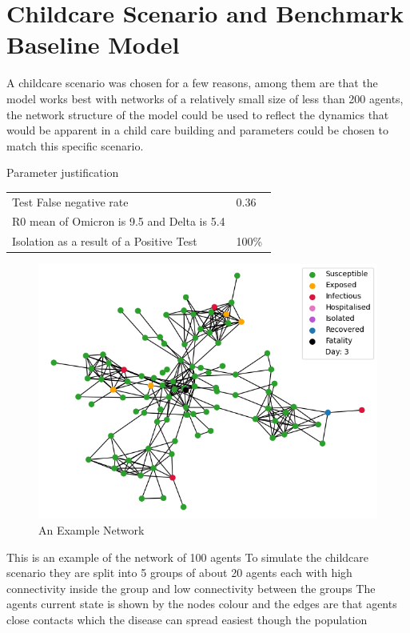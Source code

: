 \documentclass{article}
\begin{document}
\newpage



\newpage
\section{Childcare Scenario and Benchmark Baseline Model}


A childcare scenario was chosen for a few reasons, among them are that the model works best with networks of a relatively small size of less than 200 agents, the network structure of the model could be used to reflect the dynamics that would be apparent in a child care building and parameters could be chosen to match this specific scenario.\newline

Parameter justification

\begin{table}[h!]
\begin{tabular}{ll}
Test False negative rate & 0.36 ~\cite{van_de_mortel_2022} \\
R0 mean of Omicron is 9.5 and Delta is 5.4 & ~\cite{liu_rocklov_2022} \\
Isolation as a result of a Positive Test & 100\%
\end{tabular}
\end{table}

\begin{figure}[h!]
\centering
\includegraphics[width=\textwidth]{network}
\caption{An Example Network}
\end{figure}

This is an example of the network of 100 agents
To simulate the childcare scenario they are split into 5 groups of about 20 agents each with high connectivity inside the group and low connectivity between the groups 
The agents current state is shown by the nodes colour and the edges are that agents close contacts which the disease can spread easiest though the population\newline
\end{document}
